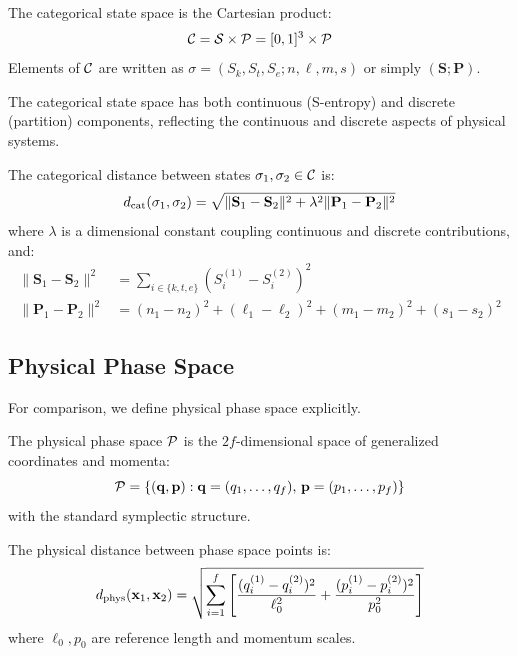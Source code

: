 \begin{definition}
\label{def:categorical_space}
The categorical state space is the Cartesian product:
\begin{equation}
\mathcal{C} = \mathcal{S} \times \mathcal{P} = [0,1]^3 \times \mathcal{P}
\end{equation}
Elements of $\mathcal{C}$ are written as $\sigma = (S_k, S_t, S_e; n, \ell, m, s)$ or simply $(\mathbf{S}; \mathbf{P})$.
\end{definition}

The categorical state space has both continuous (S-entropy) and discrete (partition) components, reflecting the continuous and discrete aspects of physical systems.

\begin{definition}
\label{def:categorical_distance}
The categorical distance between states $\sigma_1, \sigma_2 \in \mathcal{C}$ is:
\begin{equation}
d_{\mathrm{cat}}(\sigma_1, \sigma_2) = \sqrt{\|\mathbf{S}_1 - \mathbf{S}_2\|^2 + \lambda^2 \|\mathbf{P}_1 - \mathbf{P}_2\|^2}
\label{eq:cat_distance}
\end{equation}
where $\lambda$ is a dimensional constant coupling continuous and discrete contributions, and:
\begin{align}
\|\mathbf{S}_1 - \mathbf{S}_2\|^2 &= \sum_{i \in \{k,t,e\}} (S_i^{(1)} - S_i^{(2)})^2 \\
\|\mathbf{P}_1 - \mathbf{P}_2\|^2 &= (n_1 - n_2)^2 + (\ell_1 - \ell_2)^2 + (m_1 - m_2)^2 + (s_1 - s_2)^2
\end{align}
\end{definition}

\subsection{Physical Phase Space}

For comparison, we define physical phase space explicitly.

\begin{definition}
The physical phase space $\mathcal{P}$ is the $2f$-dimensional space of generalized coordinates and momenta:
\begin{equation}
\mathcal{P} = \{(\mathbf{q}, \mathbf{p}) : \mathbf{q} = (q_1, \ldots, q_f), \, \mathbf{p} = (p_1, \ldots, p_f)\}
\end{equation}
with the standard symplectic structure.
\end{definition}

\begin{definition}
The physical distance between phase space points is:
\begin{equation}
d_{\mathrm{phys}}(\mathbf{x}_1, \mathbf{x}_2) = \sqrt{\sum_{i=1}^{f} \left[\frac{(q_i^{(1)} - q_i^{(2)})^2}{\ell_0^2} + \frac{(p_i^{(1)} - p_i^{(2)})^2}{p_0^2}\right]}
\label{eq:phys_distance}
\end{equation}
where $\ell_0, p_0$ are reference length and momentum scales.
\end{definition}

